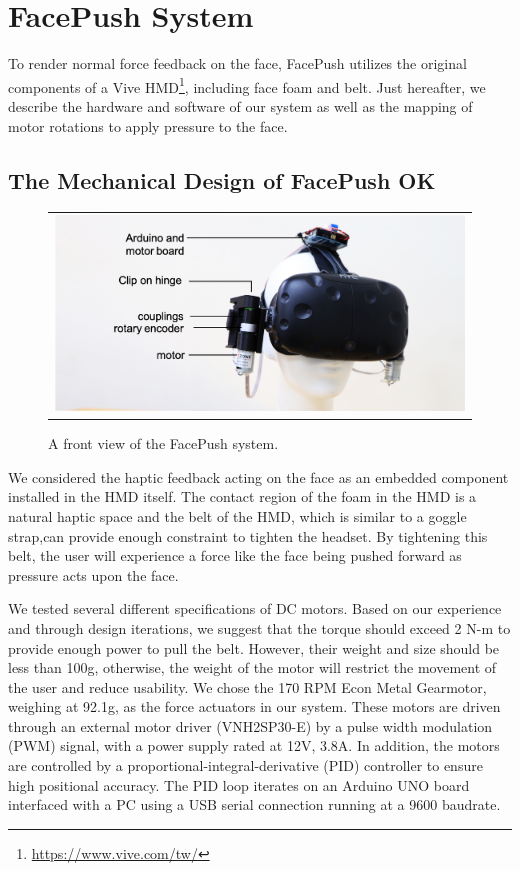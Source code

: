 \chapter{FacePush System} \label{chapter:system}
To render normal force feedback on the face, FacePush utilizes the original components of a Vive HMD\footnote{\url{https://www.vive.com/tw/}}, including face foam and belt. Just hereafter, we describe the hardware and software of our system as well as the mapping of motor rotations to apply pressure to the face.

\section{The Mechanical Design of FacePush OK}

\begin{figure}[h]
\begin{center}
    \begin{tabular}{@{\hspace{0.1cm}}c}
    \includegraphics[width=1\textwidth]{figures/FrontView.png}
    \end{tabular}
    \caption{A front view of the FacePush system.}
    \label{fig:FrontView}
    \end{center}
\end{figure}

We considered the haptic feedback acting on the face as an embedded component installed in the HMD itself. The contact region of the foam in the HMD is a natural haptic space and the belt of the HMD, which is similar to a goggle strap,can provide  enough  constraint  to  tighten  the  headset. By tightening this belt, the user will experience a force like the face being pushed forward as pressure acts upon the face.

We tested several different specifications of DC motors. Based on our experience and through design iterations, we suggest that the torque should exceed 2 N-m to provide enough power to pull the belt. However, their weight and size should be less than 100g, otherwise, the weight of the motor will restrict the movement of the user and reduce usability. We chose the 170 RPM Econ Metal Gearmotor, weighing at 92.1g, as the force actuators in our system. These motors are driven through an external motor driver (VNH2SP30-E) by a pulse width modulation (PWM) signal, with a power supply rated at 12V, 3.8A. In addition, the motors are controlled by a proportional-integral-derivative (PID) controller to ensure high positional accuracy. The PID loop iterates on an Arduino UNO board interfaced with a PC using a USB serial connection running at a 9600 baudrate.

